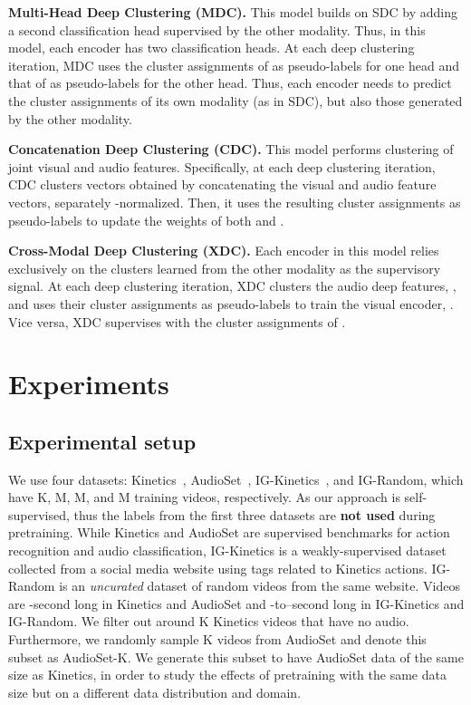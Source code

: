 \documentclass{article}
\begin{document}
\noindent\textbf{Multi-Head Deep Clustering (MDC).} 
This model builds on SDC by adding a second classification head supervised by the other modality. Thus, in this model, each encoder has two classification heads. At each deep clustering iteration, MDC uses the cluster assignments of  as pseudo-labels for one head and that of  as pseudo-labels for the other head. Thus, each encoder needs to predict the cluster assignments of its own modality (as in SDC), but also those generated by the other modality.

\noindent\textbf{Concatenation Deep Clustering (CDC).} 
This model performs clustering of joint visual and audio features. Specifically, at each deep clustering iteration, CDC clusters vectors obtained by concatenating the visual and audio feature vectors, separately -normalized. Then, it uses the resulting cluster assignments as pseudo-labels to update the weights of both  and .

\noindent\textbf{Cross-Modal Deep Clustering (XDC).} 
Each encoder in this model relies exclusively on the clusters learned from the other modality as the supervisory signal. At each deep clustering iteration, XDC clusters the audio deep features, , and uses their cluster assignments as pseudo-labels to train the visual encoder, . Vice versa, XDC supervises  with the cluster assignments of .
 \vspace{-2pt}
\section{Experiments}
\label{sec:ablation_experiments}

\vspace{-2pt}
\subsection{Experimental setup}
\vspace{-2pt}

We use four datasets: Kinetics~\cite{kinetics}, AudioSet~\cite{AudioSet}, IG-Kinetics~\cite{ghadiyaram2019large}, and IG-Random, which have K, M, M, and M training videos, respectively.
As our approach is self-supervised, thus the labels from the first three datasets are {\bf not used} during pretraining. While Kinetics and AudioSet are supervised benchmarks for action recognition and audio classification, IG-Kinetics is a weakly-supervised dataset collected from a social media website using tags related to Kinetics actions. IG-Random is an \textit{uncurated} dataset of random videos from the same website. Videos are -second long in Kinetics and AudioSet and -to--second long in IG-Kinetics and IG-Random. We filter out around K Kinetics videos that have no audio. Furthermore, we randomly sample K videos from AudioSet and denote this subset as AudioSet-K. We generate this subset to have AudioSet data of the same size as Kinetics, in order to study the effects of pretraining with the same data size but on a different data distribution and domain. 
\end{document}
